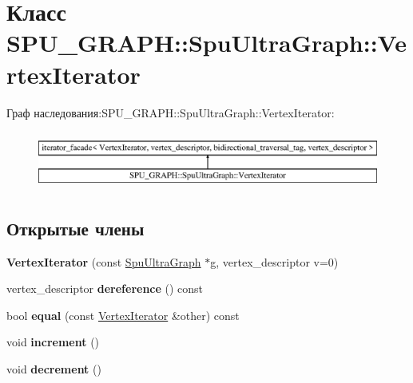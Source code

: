 \hypertarget{class_s_p_u___g_r_a_p_h_1_1_spu_ultra_graph_1_1_vertex_iterator}{}\section{Класс S\+P\+U\+\_\+\+G\+R\+A\+PH\+:\+:Spu\+Ultra\+Graph\+:\+:Vertex\+Iterator}
\label{class_s_p_u___g_r_a_p_h_1_1_spu_ultra_graph_1_1_vertex_iterator}
Граф наследования\+:S\+P\+U\+\_\+\+G\+R\+A\+PH\+:\+:Spu\+Ultra\+Graph\+:\+:Vertex\+Iterator\+:\begin{figure}[H]
\begin{center}
\leavevmode
\includegraphics[height=1.924399cm]{class_s_p_u___g_r_a_p_h_1_1_spu_ultra_graph_1_1_vertex_iterator}
\end{center}
\end{figure}
\subsection*{Открытые члены}
\begin{DoxyCompactItemize}
\item 
\mbox{\label{class_s_p_u___g_r_a_p_h_1_1_spu_ultra_graph_1_1_vertex_iterator_a44ad1919b43f91727e32b97bc4a26801}} 
{\bfseries Vertex\+Iterator} (const \hyperlink{class_s_p_u___g_r_a_p_h_1_1_spu_ultra_graph}{Spu\+Ultra\+Graph} $\ast$g, vertex\+\_\+descriptor v=0)
\item 
\mbox{\label{class_s_p_u___g_r_a_p_h_1_1_spu_ultra_graph_1_1_vertex_iterator_ad631b16614705649ab2fb57dd9173664}} 
vertex\+\_\+descriptor {\bfseries dereference} () const
\item 
\mbox{\label{class_s_p_u___g_r_a_p_h_1_1_spu_ultra_graph_1_1_vertex_iterator_a6bbd7e9d20bcb9e265ebfb3aeb88535e}} 
bool {\bfseries equal} (const \hyperlink{class_s_p_u___g_r_a_p_h_1_1_spu_ultra_graph_1_1_vertex_iterator}{Vertex\+Iterator} \&other) const
\item 
\mbox{\label{class_s_p_u___g_r_a_p_h_1_1_spu_ultra_graph_1_1_vertex_iterator_ae2da860f819452beb1db75862bda88ef}} 
void {\bfseries increment} ()
\item 
\mbox{\label{class_s_p_u___g_r_a_p_h_1_1_spu_ultra_graph_1_1_vertex_iterator_a99a6b17f75f1847ba21dc3a400bfc36b}} 
void {\bfseries decrement} ()
\end{DoxyCompactItemize}
